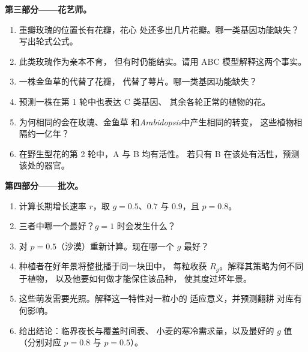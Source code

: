\begin{problem}
\medskip
\noindent\textbf{第三部分——花艺师。}
\begin{enumerate}[resume]
  \item 重瓣玫瑰的位置长有花瓣，花心
        处还多出几片花瓣。哪一类基因功能缺失？
        写出轮式公式。
  \item 此类玫瑰作为亲本不育，
        但有时仍能结实。请用 ABC 模型解释这两个事实。
  \item 一株金鱼草的代替了花瓣，
        代替了萼片。哪一类基因功能缺失？
  \item 预测一株在第 1 轮中也表达 C 类基因、
        其余各轮正常的植物的花。
  \item 为何相同的会在玫瑰、金鱼草
        和\emph{Arabidopsis}中产生相同的转变，
        这些植物相隔约一亿年？
  \item 在野生型花的第 2 轮中，A 与 B 均有活性。
        若只有 B 在该处有活性，预测该处的器官。
\end{enumerate}

\medskip
\noindent\textbf{第四部分——批次。}
\begin{enumerate}[resume]
  \item 计算长期增长速率 $r$，取 $g = 0.5$、$0.7$
        与 $0.9$，且 $p = 0.8$。
  \item 三者中哪一个最好？$g = 1$ 时会发生什么？
  \item 对 $p = 0.5$（沙漠）重新计算。现在哪一个 $g$ 最好？
  \item 种植者在好年景将整批播于同一块田中，
        每粒收获 $R_g$。解释其策略为何不同于植物，
        以及他要如何做才能保住该品种，
        使其度过坏年景。
  \item 这些萌发需要光照。解释这一特性对一粒小的
        适应意义，并预测翻耕
        对库有何影响。
  \item 给出结论：临界夜长与覆盖时间表、
        小麦的寒冷需求量，以及最好的 $g$ 值
        （分别对应 $p = 0.8$ 与 $p = 0.5$）。
\end{enumerate}
\end{problem}
